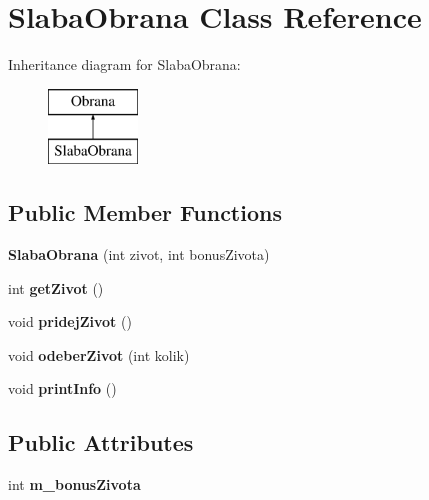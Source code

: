 \hypertarget{class_slaba_obrana}{}\section{Slaba\+Obrana Class Reference}
\label{class_slaba_obrana}
Inheritance diagram for Slaba\+Obrana\+:\begin{figure}[H]
\begin{center}
\leavevmode
\includegraphics[height=2.000000cm]{class_slaba_obrana}
\end{center}
\end{figure}
\subsection*{Public Member Functions}
\begin{DoxyCompactItemize}
\item 
\mbox{\label{class_slaba_obrana_ab2be25cfea788c5be811426b4ec57e7d}} 
{\bfseries Slaba\+Obrana} (int zivot, int bonus\+Zivota)
\item 
\mbox{\label{class_slaba_obrana_aa92e97d5c29ce5500f1d981eef43a4b4}} 
int {\bfseries get\+Zivot} ()
\item 
\mbox{\label{class_slaba_obrana_ade3391029db83c901b6234c75f15b7b0}} 
void {\bfseries pridej\+Zivot} ()
\item 
\mbox{\label{class_slaba_obrana_abc330fc49f131ff5f83a6333e97db94e}} 
void {\bfseries odeber\+Zivot} (int kolik)
\item 
\mbox{\label{class_slaba_obrana_a3ea5b7c2db7c815676fac8378e188c13}} 
void {\bfseries print\+Info} ()
\end{DoxyCompactItemize}
\subsection*{Public Attributes}
\begin{DoxyCompactItemize}
\item 
\mbox{\label{class_slaba_obrana_a95bf94b483018f819856bcd1aab3665c}} 
int {\bfseries m\+\_\+bonus\+Zivota}
\end{DoxyCompactItemize}
